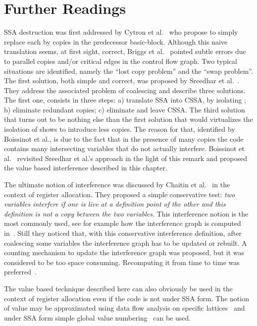  \section{Further Readings}
SSA destruction was first addressed by Cytron et al.~\cite{CFR+91} who propose to simply replace each \phifun by copies in the predecessor basic-block. Although this naive translation seems, at first sight, correct, Briggs et
al.~\cite{BriggsSSA} pointed subtle errors due to parallel copies and/or
critical edges in the control flow graph. Two typical situations are
identified, namely the ``lost copy problem'' and the ``swap problem''.
The first solution, both simple and correct, was proposed by Sreedhar et al.~\cite{VC+99}. They address the associated problem of coalescing and describe three solutions. 
The first one, consists in three
steps: a) translate SSA into CSSA, by isolating \phifuns; b)
eliminate redundant copies; c) eliminate \phifuns and leave CSSA.
The third solution that turns out to be nothing else than the first solution that would virtualizes the isolation of \phifuns shows to introduce less copies. The reason for that, identified by Boissinot et al., is due to the fact that in the presence of many copies the code contains many intersecting variables that do not actually interfere. Boissinot et al.~\cite{Boissinot09} revisited Sreedhar et al.'s approach in the light of this remark and proposed the value based interference described in this chapter.

The ultimate notion of interference was discussed by Chaitin et al.~\cite{Chaitin81} in the context of register allocation. 
They proposed a simple conservative test: \emph{two variables interfere if
  one is live at a definition point of the other and this definition is not a
  copy between the two variables}. This interference notion is the most
commonly used, see for example how the interference graph is computed
in~\cite{appel:2002:modern}. Still they noticed that, with this conservative interference definition,
after coalescing some variables the interference graph has to be updated or rebuilt. 
A counting mechanism to update the interference graph was proposed,  but it was considered to be
too space consuming. Recomputing it from time to time was preferred~\cite{Chaitin81,Chaitin82}.

The value based technique described here can also obviously be used in the context of register allocation even if the code is not under SSA form. The notion of value may be approximated using data flow analysis on specific lattices~\cite{AlpernWZ88} and under SSA form simple global value numbering~\cite{Rosen88} can be used.

